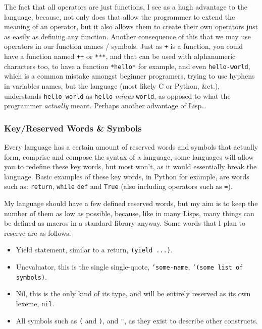 \documentclass{article}
\newcommand{\code}[1]{\texttt{#1}}
\newcommand{\etc}{{\&}ct.}
\begin{document}
      The fact that all operators are just functions, I see as a hugh advantage
      to the language, because, not only does that allow the programmer to
      extend the meaning of an operator, but it also allows them to create their
      own operators just as easily as defining any function. Another consequence
      of this that we may use operators in our function names / symbols.
      Just as \code{+} is a function, you could have a function named \code{++}
      or \code{***}, and that can be used with alphanumeric characters too, to
      have a function \code{*hello*} for example, and even \code{hello-world},
      which is a common mistake amongst beginner programers, trying to use hyphens
      in variables names, but the language (most likely C or Python, \etc),
      understands \code{hello-world} as \code{hello} \emph{minus} \code{world},
      as opposed to what the programmer \emph{actually} meant. Perhaps another
      advantage of Lisp\ldots

    \clearpage
    \subsubsection{Key/Reserved Words \& Symbols}
      Every language has a certain amount of reserved words and symbols that
      actually form, comprise and compose the syntax of a language, some
      languages will allow you to redefine these key words, but most won't, as
      it would essentially break the language.  Basic examples of these key
      words, in Python for example, are words such as: \code{return}, \code{while}
      \code{def} and \code{True} (also including operators such as \code{=}).

      My language should have a few defined reserved words, but my aim is to keep
      the number of them as low as possible, because, like in many Lisps, many
      things can be defined as macros in a standard library anyway.
      Some words that I plan to reserve are as follows:

      \begin{itemize}
        \item Yield statement, similar to a return, \code{(yield ...)}.
        \item Unevaluator, this is the single single-quote, \code{'some-name},
              \code{'(some list of symbols)}.
        \item Nil, this is the only kind of its type, and will be entirely
              reserved as its own lexeme, \code{nil}.
        \item All symbols such as \code{(} and \code{)}, and \code{"}, as they
              exist to describe other constructs.
      \end{itemize}
\end{document}
